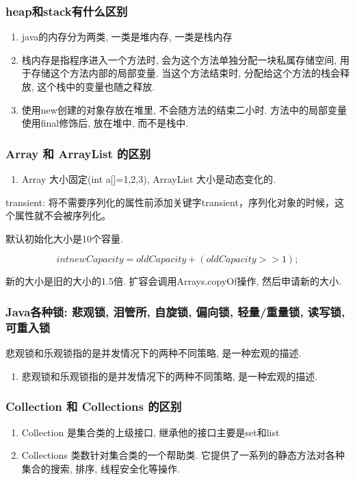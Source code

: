 \documentclass[UTF8]{ctexart}
\begin{document}
\subsubsection{heap和stack有什么区别}
\begin{enumerate}
	\item java的内存分为两类, 一类是堆内存, 一类是栈内存
	\item 栈内存是指程序进入一个方法时, 会为这个方法单独分配一块私属存储空间, 用于存储这个方法内部的局部变量. 当这个方法结束时, 分配给这个方法的栈会释放, 这个栈中的变量也随之释放.
	\item 使用new创建的对象存放在堆里, 不会随方法的结束二小时. 方法中的局部变量使用final修饰后, 放在堆中, 而不是栈中.

\end{enumerate}

\subsubsection{Array 和 ArrayList 的区别}
\begin{enumerate}
	\item Array 大小固定(int a[]={1,2,3}), ArrayList 大小是动态变化的.
\end{enumerate}
transient: 将不需要序列化的属性前添加关键字transient，序列化对象的时候，这个属性就不会被序列化。

默认初始化大小是10个容量.

$$int newCapacity = oldCapacity + (oldCapacity >> 1);$$

新的大小是旧的大小的1.5倍. 扩容会调用Arrays.copyOf操作, 然后申请新的大小.
\subsubsection{Java各种锁: 悲观锁, 泪管所, 自旋锁, 偏向锁, 轻量/重量锁, 读写锁, 可重入锁}
悲观锁和乐观锁指的是并发情况下的两种不同策略, 是一种宏观的描述.
\par

\begin{enumerate}
	\item 悲观锁和乐观锁指的是并发情况下的两种不同策略, 是一种宏观的描述.

\end{enumerate}
\subsubsection{Collection 和 Collections 的区别}
\begin{enumerate}
	\item Collection 是集合类的上级接口, 继承他的接口主要是set和list
	\item Collections 类数针对集合类的一个帮助类. 它提供了一系列的静态方法对各种集合的搜索, 排序, 线程安全化等操作.
\end{enumerate}
\end{document}
